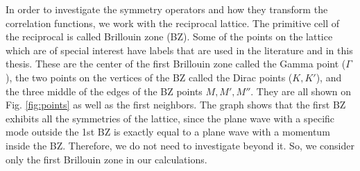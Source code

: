 In order to investigate the symmetry operators and how they transform the correlation functions, we work with the reciprocal lattice. The primitive cell of the reciprocal is called Brillouin zone (BZ). Some of the points on the lattice which are of special interest have labels that are used in the literature and in this thesis. These are the center of the first Brillouin zone called the Gamma point ($\Gamma$), the two points on the vertices of the BZ called the Dirac points ($K, K'$), and the three middle of the edges of the BZ points $M, M', M''$. They are all shown on Fig. \ref{fig:points} as well as the first neighbors. The graph shows that the first BZ exhibits all the symmetries of the lattice, since the plane wave with a specific mode outside the 1st BZ is exactly equal to a plane wave with a momentum inside the BZ. Therefore, we do not need to investigate beyond it. So, we consider only the first Brillouin zone in our calculations.
